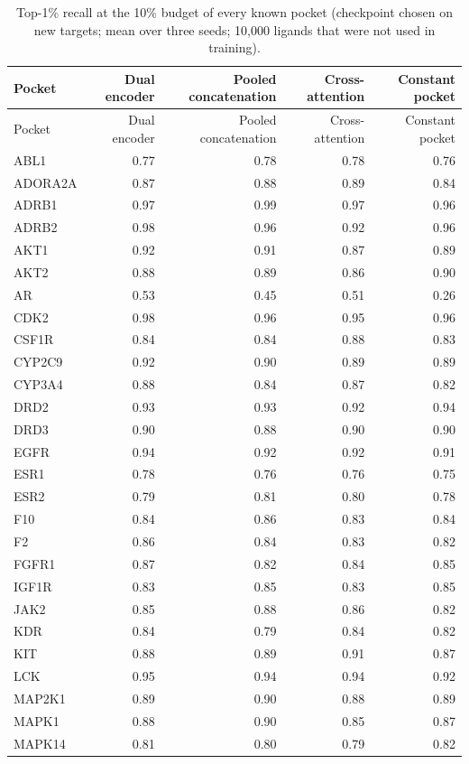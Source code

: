 \begin{longtable}{lrrrr}
\caption{Top-1\% recall at the 10\% budget of every known pocket (checkpoint chosen on new targets; mean over three seeds; 10{,}000 ligands that were not used in training).}\label{tab:si_known_targets}\\
\toprule
Pocket & Dual encoder & Pooled concatenation & Cross-attention & Constant pocket \\
\midrule
\endfirsthead
\toprule
Pocket & Dual encoder & Pooled concatenation & Cross-attention & Constant pocket \\
\midrule
\endhead
ABL1 & 0.77 & 0.78 & 0.78 & 0.76 \\
ADORA2A & 0.87 & 0.88 & 0.89 & 0.84 \\
ADRB1 & 0.97 & 0.99 & 0.97 & 0.96 \\
ADRB2 & 0.98 & 0.96 & 0.92 & 0.96 \\
AKT1 & 0.92 & 0.91 & 0.87 & 0.89 \\
AKT2 & 0.88 & 0.89 & 0.86 & 0.90 \\
AR & 0.53 & 0.45 & 0.51 & 0.26 \\
CDK2 & 0.98 & 0.96 & 0.95 & 0.96 \\
CSF1R & 0.84 & 0.84 & 0.88 & 0.83 \\
CYP2C9 & 0.92 & 0.90 & 0.89 & 0.89 \\
CYP3A4 & 0.88 & 0.84 & 0.87 & 0.82 \\
DRD2 & 0.93 & 0.93 & 0.92 & 0.94 \\
DRD3 & 0.90 & 0.88 & 0.90 & 0.90 \\
EGFR & 0.94 & 0.92 & 0.92 & 0.91 \\
ESR1 & 0.78 & 0.76 & 0.76 & 0.75 \\
ESR2 & 0.79 & 0.81 & 0.80 & 0.78 \\
F10 & 0.84 & 0.86 & 0.83 & 0.84 \\
F2 & 0.86 & 0.84 & 0.83 & 0.82 \\
FGFR1 & 0.87 & 0.82 & 0.84 & 0.85 \\
IGF1R & 0.83 & 0.85 & 0.83 & 0.85 \\
JAK2 & 0.85 & 0.88 & 0.86 & 0.82 \\
KDR & 0.84 & 0.79 & 0.84 & 0.82 \\
KIT & 0.88 & 0.89 & 0.91 & 0.87 \\
LCK & 0.95 & 0.94 & 0.94 & 0.92 \\
MAP2K1 & 0.89 & 0.90 & 0.88 & 0.89 \\
MAPK1 & 0.88 & 0.90 & 0.85 & 0.87 \\
MAPK14 & 0.81 & 0.80 & 0.79 & 0.82 \\

\end{longtable}
